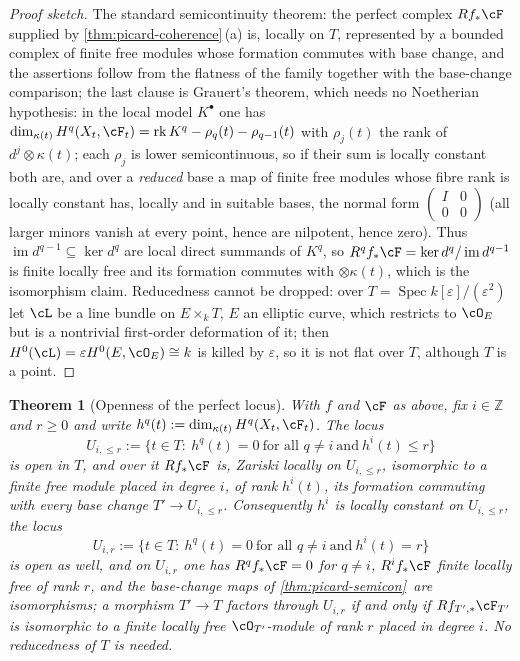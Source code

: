 \documentclass[11pt]{article}
\theoremstyle{plain}
\newtheorem{theorem}{Theorem}[section]
\theoremstyle{definition}
\newcommand{\Z}{\mathbb Z}
\DeclareMathOperator{\Spec}{Spec}
\newcommand{\Cref}[1]{\hyperref[#1]{\ref{#1}}\,\hyperref[#1]{\nameref*{#1}}}
\begin{document}
\begin{proof}[Proof sketch]
The standard semicontinuity theorem: the perfect complex $Rf_*\cF$
supplied by \Cref{thm:picard-coherence}(a) is, locally on $T$, represented by a
bounded complex of finite free modules whose formation commutes with
base change, and the assertions follow from the flatness of the
family together with the base-change comparison; the last clause is
Grauert's theorem, which needs no Noetherian hypothesis: in the local
model $K^\bullet$ one has
$\dim_{\kappa(t)}H^q(X_t,\cF_t)=\operatorname{rk}K^q-\rho_q(t)-\rho_{q-1}(t)$
with $\rho_j(t)$ the rank of $d^j\otimes\kappa(t)$; each $\rho_j$ is
lower semicontinuous, so if their sum is locally constant both are, and
over a \emph{reduced} base a map of finite free modules whose fibre
rank is locally constant has, locally and in suitable bases, the normal
form $\begin{pmatrix}I&0\\0&0\end{pmatrix}$ (all larger minors vanish
at every point, hence are nilpotent, hence zero).  Thus
$\operatorname{im}d^{q-1}\subseteq\ker d^q$ are local direct summands
of $K^q$, so $R^qf_*\cF=\ker d^q/\operatorname{im}d^{q-1}$ is finite
locally free and its formation commutes with $\otimes\kappa(t)$, which
is the isomorphism claim.  Reducedness
cannot be dropped: over $T=\Spec k[\varepsilon]/(\varepsilon^2)$ let
$\cL$ be a line bundle on $E\times_kT$, $E$ an elliptic curve, which
restricts to $\cO_E$ but is a nontrivial first-order deformation of it;
then $H^0(\cL)=\varepsilon H^0(E,\cO_E)\cong k$ is killed by
$\varepsilon$, so it is not flat over $T$, although $T$ is a point.
\end{proof}

\begin{theorem}[Openness of the perfect locus]
\label{thm:picard-perfect}
With $f$ and $\cF$ as above, fix $i\in\Z$ and $r\ge0$ and write
$h^q(t):=\dim_{\kappa(t)}H^q(X_t,\cF_t)$.  The locus
\[
 U_{i,\le r}:=\{t\in T:\ h^q(t)=0\ \text{for all }q\neq i\ \text{and}\ h^i(t)\le r\}
\]
is \emph{open} in $T$, and over it $Rf_*\cF$ is, Zariski locally on
$U_{i,\le r}$, isomorphic to a finite free module placed in degree $i$,
of rank $h^i(t)$, its formation commuting with every base change
$T'\to U_{i,\le r}$.  Consequently $h^i$ is locally constant on
$U_{i,\le r}$, the locus
\[
 U_{i,r}:=\{t\in T:\ h^q(t)=0\ \text{for all }q\neq i\ \text{and}\ h^i(t)=r\}
\]
is open as well, and on $U_{i,r}$ one has $R^qf_*\cF=0$ for $q\neq i$,
$R^if_*\cF$ finite locally free of rank $r$, and the base-change maps of
\Cref{thm:picard-semicon} are isomorphisms; a morphism $T'\to T$
factors through $U_{i,r}$ if and only if $Rf_{T',*}\cF_{T'}$ is
isomorphic to a finite locally free $\cO_{T'}$-module of rank $r$
placed in degree $i$.  No reducedness of $T$ is needed.
\end{theorem}
\end{document}
